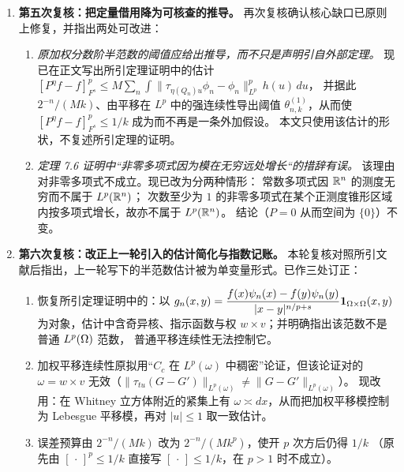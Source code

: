 \begin{enumerate}
\item \textbf{第五次复核：把定量借用降为可核查的推导。}
  再次复核确认核心缺口已原则上修复，并指出两处可改进：
  \begin{enumerate}[label=(\arabic*)]
    \item \emph{原加权分数阶半范数的阈值应给出推导，而不只是声明引自外部定理。}
          现已在正文写出所引定理证明中的估计
          $[P^{\eta}f-f]_{F^s}^p\le M\sum_n\int\|\tau_{\eta(Q_n)u}\phi_n-\phi_n\|_{L^p}^p\,h(u)\,du$，
          并据此 $2^{-n}/(Mk)$、由平移在 $L^p$ 中的强连续性导出阈值
          $\theta^{(1)}_{n,k}$，从而使 $[P^{\eta}f-f]_{F^s}^p\le1/k$ 成为而不再是一条外加假设。
          本文只使用该估计的形状，不复述所引定理的证明。
    \item \emph{定理 7.6 证明中``非零多项式因为模在无穷远处增长``的措辞有误。}
          该理由对非零多项式不成立。现已改为分两种情形：
          常数多项式因 $\mathbb{R}^n$ 的测度无穷而不属于 $L^p(\mathbb{R}^n)$；
          次数至少为 $1$ 的非零多项式在某个正测度锥形区域内按多项式增长，故亦不属于 $L^p(\mathbb{R}^n)$。
          结论（$P=0$ 从而空间为 $\{0\}$）不变。
  \end{enumerate}

\item \textbf{第六次复核：改正上一轮引入的估计简化与指数记账。}
  本轮复核对照所引文献后指出，上一轮写下的半范数估计被为单变量形式。已作三处订正：
  \begin{enumerate}[label=(\arabic*)]
    \item 恢复所引定理证明中的：以
          $g_n(x,y)=\dfrac{f(x)\psi_n(x)-f(y)\psi_n(y)}{|x-y|^{n/p+s}}\mathbf 1_{\Omega\times\Omega}(x,y)$
          为对象，估计中含奇异核、指示函数与权 $w\times v$；并明确指出该范数不是普通 $L^p(\Omega)$ 范数，
          普通平移连续性无法控制它。
    \item 加权平移连续性原拟用“$C_c$ 在 $L^p(\omega)$ 中稠密”论证，但该论证对的
          $\omega=w\times v$ 无效（$\|\tau_{tu}(G-G')\|_{L^p(\omega)}\ne\|G-G'\|_{L^p(\omega)}$）。
          现改用：在 Whitney 立方体附近的紧集上有
          $\omega\asymp dx$，从而把加权平移模控制为 Lebesgue 平移模，再对 $|u|\le1$ 取一致估计。
    \item 误差预算由 $2^{-n}/(Mk)$ 改为 $2^{-n}/(Mk^{p})$，使开 $p$ 次方后仍得 $1/k$
          （原先由 $[\,\cdot\,]^p\le1/k$ 直接写 $[\,\cdot\,]\le1/k$，在 $p>1$ 时不成立）。
  \end{enumerate}


\end{enumerate}
